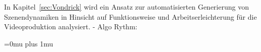 \documentclass[times, 12pt,twocolumn]{article}
\begin{document}
In Kapitel~\ref{sec:Vondrick} wird ein Ansatz zur automatisierten Generierung von Szenendynamiken in Hinsicht auf Funktionsweise und Arbeitserleichterung für die Videoproduktion analysiert. 
 \label{sec:SOTAProduktion}
- Algo Rythm: %
 \label{sec:Vondrick}

 \label{sec:Postroduktion}
 \label{sec:SOTAPostproduktion}

 \label{Zusammenfassung}




\Urlmuskip=0mu plus 1mu\relax %
 

\end{document}
